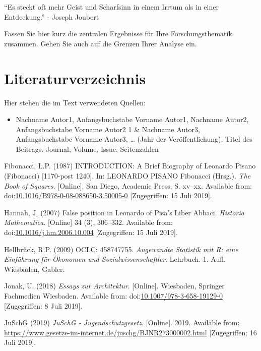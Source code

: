 \documentclass[ngerman,]{article}
\providecommand{\tightlist}{%
  \setlength{\itemsep}{0pt}\setlength{\parskip}{0pt}}
\begin{document}
``Es steckt oft mehr Geist und Scharfsinn in einem Irrtum als in einer
Entdeckung.'' - Joseph Joubert

Fassen Sie hier kurz die zentralen Ergebnisse für Ihre
Forschungsthematik zusammen. Gehen Sie auch auf die Grenzen Ihrer
Analyse ein.

\section{Literaturverzeichnis}\label{literaturverzeichnis}

Hier stehen die im Text verwendeten Quellen:

\begin{itemize}
\tightlist
\item
  Nachname Autor1, Anfangsbuchstabe Vorname Autor1, Nachname Autor2,
  Anfangsbuchstabe Vorname Autor2 1 \& Nachname Autor3, Anfangsbuchstabe
  Vorname Autor3, \ldots{} (Jahr der Veröffentlichung). Titel des
  Beitrags. Journal, Volume, Issue, Seitenzahlen
\end{itemize}

\hypertarget{refs}{}
\hypertarget{ref-fibonacci_introduction:_1987}{}
Fibonacci, L.P. (1987) INTRODUCTION: A Brief Biography of Leonardo
Pisano (Fibonacci) {[}1170-post 1240{]}. In: LEONARDO PISANO Fibonacci
(Hrsg.). \emph{The Book of Squares}. {[}Online{]}. San Diego, Academic
Press. S. xv--xx. Available from:
doi:\href{https://doi.org/10.1016/B978-0-08-088650-3.50005-0}{10.1016/B978-0-08-088650-3.50005-0}
{[}Zugegriffen: 15 Juli 2019{]}.

\hypertarget{ref-hannah_false_2007}{}
Hannah, J. (2007) False position in Leonardo of Pisa's Liber Abbaci.
\emph{Historia Mathematica}. {[}Online{]} 34 (3), 306--332. Available
from:
doi:\href{https://doi.org/10.1016/j.hm.2006.10.004}{10.1016/j.hm.2006.10.004}
{[}Zugegriffen: 15 Juli 2019{]}.

\hypertarget{ref-hellbruck_angewandte_2009}{}
Hellbrück, R.P. (2009) OCLC: 458747755. \emph{Angewandte Statistik mit
R: eine Einführung für Ökonomen und Sozialwissenschaftler}. Lehrbuch. 1.
Aufl. Wiesbaden, Gabler.

\hypertarget{ref-jonak_essays_2018}{}
Jonak, U. (2018) \emph{Essays zur Architektur}. {[}Online{]}. Wiesbaden,
Springer Fachmedien Wiesbaden. Available from:
doi:\href{https://doi.org/10.1007/978-3-658-19129-0}{10.1007/978-3-658-19129-0}
{[}Zugegriffen: 8 Juli 2019{]}.

\hypertarget{ref-juschg_juschg_2019}{}
JuSchG (2019) \emph{JuSchG - Jugendschutzgesetz}. {[}Online{]}. 2019.
Available from:
\url{https://www.gesetze-im-internet.de/juschg/BJNR273000002.html}
{[}Zugegriffen: 16 Juli 2019{]}.
\end{document}

